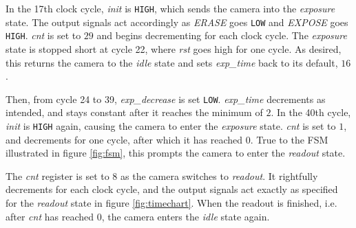 In the 17th clock cycle, \emph{init} is \verb|HIGH|, which sends the camera into the \emph{exposure} state. The output signals act accordingly as \emph{ERASE} goes \verb|LOW| and \emph{EXPOSE} goes \verb|HIGH|. \emph{cnt} is set to $29$ and begins decrementing for each clock cycle. The \emph{exposure} state is stopped short at cycle 22, where \emph{rst} goes high for one cycle. As desired, this returns the camera to the \emph{idle} state and sets \emph{exp\_time} back to its default, $16$.

Then, from cycle 24 to 39, \emph{exp\_decrease} is set \verb|LOW|. \emph{exp\_time} decrements as intended, and stays constant after it reaches the minimum of $2$. In the 40th cycle, \emph{init} is \verb|HIGH| again, causing the camera to enter the \emph{exposure} state. \emph{cnt} is set to $1$, and decrements for one cycle, after which it has reached $0$. True to the FSM illustrated in figure \ref{fig:fsm}, this prompts the camera to enter the \emph{readout} state.

The \emph{cnt} register is set to $8$ as the camera switches to \emph{readout}. It rightfully decrements for each clock cycle, and the output signals act exactly as specified for the \emph{readout} state in figure \ref{fig:timechart}. When the readout is finished, i.e. after \emph{cnt} has reached $0$, the camera enters the \emph{idle} state again.